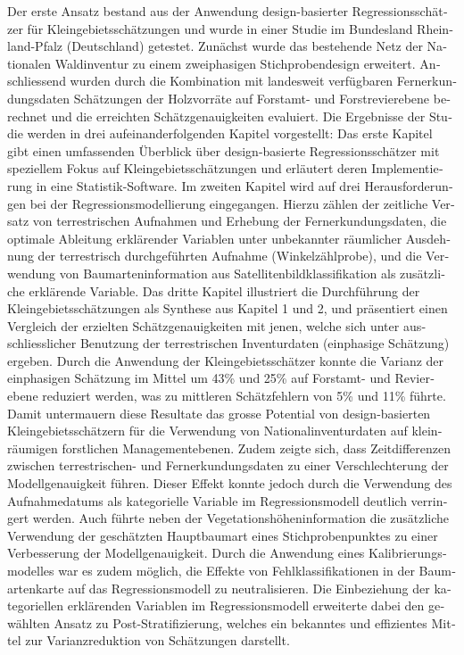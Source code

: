 \begin{otherlanguage}{ngerman}
Der erste Ansatz bestand aus der Anwendung design-basierter Regressionsschätzer für Kleingebietsschätzungen und wurde in einer Studie im Bundesland Rheinland-Pfalz (Deutschland) getestet. Zunächst wurde das bestehende Netz der Nationalen Waldinventur zu einem zweiphasigen Stichprobendesign erweitert. Anschliessend wurden durch die Kombination mit landesweit verfügbaren Fernerkundungsdaten Schätzungen der Holzvorräte auf Forstamt- und Forstrevierebene berechnet und die erreichten Schätzgenauigkeiten evaluiert. Die Ergebnisse der Studie werden in drei aufeinanderfolgenden Kapitel vorgestellt: Das erste Kapitel gibt einen umfassenden Überblick über design-basierte Regressionsschätzer mit speziellem Fokus auf Kleingebietsschätzungen und erläutert deren Implementierung in eine Statistik-Software. Im zweiten Kapitel wird auf drei Herausforderungen bei der Regressionsmodellierung eingegangen. Hierzu zählen der zeitliche Versatz von terrestrischen Aufnahmen und Erhebung der Fernerkundungsdaten, die optimale Ableitung erklärender Variablen unter unbekannter räumlicher Ausdehnung der terrestrisch durchgeführten Aufnahme (Winkelzählprobe), und die Verwendung von Baumarteninformation aus Satellitenbildklassifikation als zusätzliche erklärende Variable. Das dritte Kapitel illustriert die Durchführung der Kleingebietsschätzungen als Synthese aus Kapitel 1 und 2, und präsentiert einen Vergleich der erzielten Schätzgenauigkeiten mit jenen, welche sich unter ausschliesslicher Benutzung der terrestrischen Inventurdaten (einphasige Schätzung) ergeben. Durch die Anwendung der Kleingebietsschätzer konnte die Varianz der einphasigen Schätzung im Mittel um 43\% und 25\% auf Forstamt- und Revierebene reduziert werden, was zu mittleren Schätzfehlern von 5\% und 11\% führte. Damit untermauern diese Resultate das grosse Potential von design-basierten Kleingebietsschätzern für die Verwendung von Nationalinventurdaten auf kleinräumigen forstlichen Managementebenen. Zudem zeigte sich, dass Zeitdifferenzen zwischen terrestrischen- und Fernerkundungsdaten zu einer Verschlechterung der Modellgenauigkeit führen. Dieser Effekt konnte jedoch durch die Verwendung des Aufnahmedatums als kategorielle Variable im Regressionsmodell deutlich verringert werden. Auch führte neben der Vegetationshöheninformation die zusätzliche Verwendung der geschätzten Hauptbaumart eines Stichprobenpunktes zu einer Verbesserung der Modellgenauigkeit. Durch die Anwendung eines Kalibrierungsmodelles war es zudem möglich, die Effekte von Fehlklassifikationen in der Baumartenkarte auf das Regressionsmodell zu neutralisieren. Die Einbeziehung der kategoriellen erklärenden Variablen im Regressionsmodell erweiterte dabei den gewählten Ansatz zu Post-Stratifizierung, welches ein bekanntes und effizientes Mittel zur Varianzreduktion von Schätzungen darstellt.\par


\end{otherlanguage}
